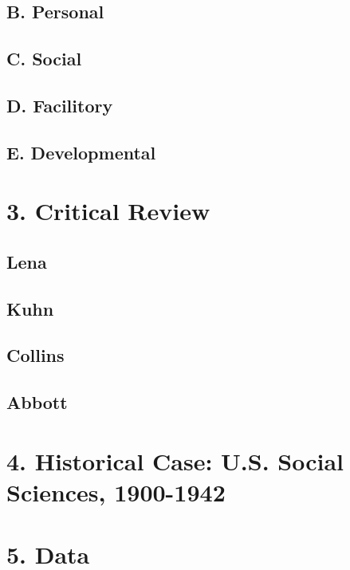 \subsection{B. Personal}\label{b.-personal}

\subsection{C. Social}\label{c.-social}

\subsection{D. Facilitory}\label{d.-facilitory}

\subsection{E. Developmental}\label{e.-developmental}

\section{3. Critical Review}\label{critical-review}

\subsection{Lena}\label{lena}

\subsection{Kuhn}\label{kuhn}

\subsection{Collins}\label{collins}

\subsection{Abbott}\label{abbott}

\section{4. Historical Case: U.S. Social Sciences,
1900-1942}\label{historical-case-u.s.-social-sciences-1900-1942}

\section{5. Data}\label{data}

